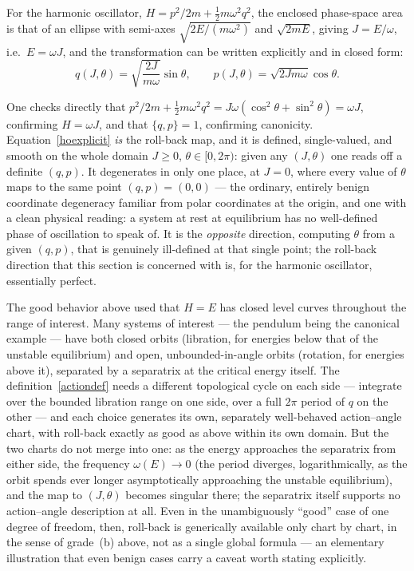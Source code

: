 For the harmonic oscillator, $H=p^2/2m+\tfrac12 m\omega^2q^2$, the enclosed
phase-space area is that of an ellipse with semi-axes $\sqrt{2E/(m\omega^2)}$
and $\sqrt{2mE}$, giving $J=E/\omega$, i.e.\ $E=\omega J$, and the
transformation can be written explicitly and in closed form:
\begin{equation}
q(J,\theta)=\sqrt{\frac{2J}{m\omega}}\sin\theta,
    \qquad p(J,\theta)=\sqrt{2Jm\omega}\cos\theta .
\label{hoexplicit}
\end{equation}

One checks directly that
$p^2/2m+\tfrac12m\omega^2q^2=J\omega(\cos^2\theta+\sin^2\theta)=\omega J$,
confirming $H=\omega J$, and that $\{q,p\}=1$, confirming canonicity.
Equation~\eqref{hoexplicit} \emph{is} the roll-back map, and it is defined,
single-valued, and smooth on the whole domain $J\ge0$, $\theta\in[0,2\pi)$:
given any $(J,\theta)$ one reads off a definite $(q,p)$. It degenerates in only
one place, at $J=0$, where every value of $\theta$ maps to the same point
$(q,p)=(0,0)$ --- the ordinary, entirely benign coordinate degeneracy familiar
from polar coordinates at the origin, and one with a clean physical reading: a
system at rest at equilibrium has no well-defined phase of oscillation to speak
of. It is the \emph{opposite} direction, computing $\theta$ from a given
$(q,p)$, that is genuinely ill-defined at that single point; the roll-back
direction that this section is concerned with is, for the harmonic oscillator,
essentially perfect.

The good behavior above used that $H=E$ has closed level curves
throughout the range of interest. Many systems of interest --- the pendulum
being the canonical example --- have both closed orbits (libration, for
energies below that of the unstable equilibrium) and open, unbounded-in-angle
orbits (rotation, for energies above it), separated by a separatrix at the
critical energy itself. The definition~\eqref{actiondef} needs a different
topological cycle on each side --- integrate over the bounded libration range
on one side, over a full $2\pi$ period of $q$ on the other --- and each choice
generates its own, separately well-behaved action--angle chart, with roll-back
exactly as good as above within its own domain. But the two charts do
not merge into one: as the energy approaches the separatrix from either side,
the frequency $\omega(E)\to0$ (the period diverges, logarithmically, as the
orbit spends ever longer asymptotically approaching the unstable equilibrium),
and the map to $(J,\theta)$ becomes singular there; the separatrix itself
supports no action--angle description at all. Even in the unambiguously
``good'' case of one degree of freedom, then, roll-back is generically
available only chart by chart, in the sense of grade~(b) above, not as a single
global formula --- an elementary illustration that even benign cases carry a
caveat worth stating explicitly.

